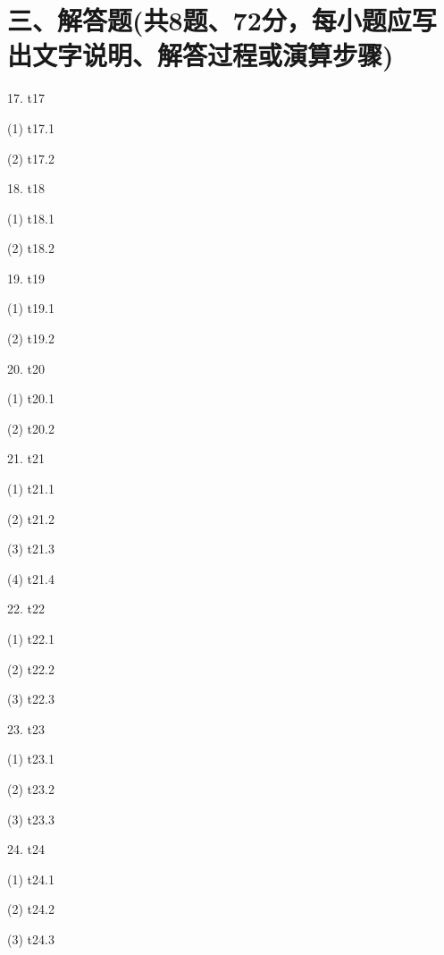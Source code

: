 \documentclass[10pt]{article}
\begin{document}
\section*{\normalsize 三、解答题(共8题、72分，每小题应写出文字说明、解答过程或演算步骤)}
\begin{markdown}
17. t17

(1) t17.1

(2) t17.2

18. t18

(1) t18.1

(2) t18.2

19. t19

(1) t19.1

(2) t19.2

20. t20

(1) t20.1

(2) t20.2

21. t21

(1) t21.1

(2) t21.2

(3) t21.3

(4) t21.4

22. t22

(1) t22.1

(2) t22.2

(3) t22.3

23. t23

(1) t23.1

(2) t23.2

(3) t23.3

24. t24

(1) t24.1

(2) t24.2

(3) t24.3

\end{markdown}
\end{document}
